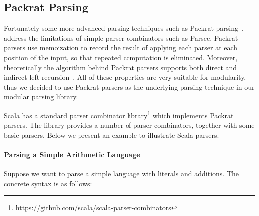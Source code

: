 \subsection{Packrat Parsing}\label{subsec:packratparsing}
Fortunately some more advanced parsing techniques such as Packrat parsing~\cite{Ford2002}, address the limitations of simple parser combinators such as Parsec. Packrat parsers use memoization to record the result of applying each parser at each position of the input, so that repeated computation is eliminated.  Moreover, theoretically the algorithm behind Packrat parsers supports both direct and indirect left-recursion~\cite{warth2008}. All of these properties are very suitable for modularity, thus we decided to use Packrat parsers as the underlying parsing technique in our modular parsing library.
\begin{comment}
It is worth mentioning that the choice of parser combinators will not
affect the other parts of our library. One can choose other parser
combinators like Parsec, in cases that the performance and supporting
of left-recursion are not major concerns. A different library can even build a new
\name with fancy features or higher efficiency.
\end{comment}
Scala has a standard parser combinator library\footnote{https://github.com/scala/scala-parser-combinators}
which implements Packrat parsers.
The library provides a number of parser combinators, together with some basic parsers.
Below we present an example to illustrate Scala parsers.
%

\paragraph{Parsing a Simple Arithmetic Language}
Suppose we want to parse a simple language with literals and
additions. The concrete syntax is as follows:

